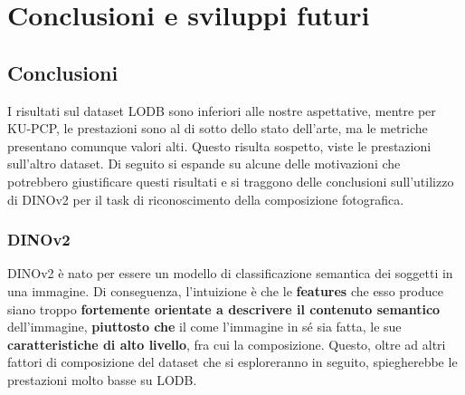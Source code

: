 \chapter{Conclusioni e sviluppi futuri}
\label{conclusioni}

\section{Conclusioni}
I risultati sul dataset LODB sono inferiori alle nostre aspettative, mentre per KU-PCP, le prestazioni sono al di sotto dello stato dell'arte, ma le metriche presentano comunque valori alti. Questo risulta sospetto, viste le prestazioni sull'altro dataset. Di seguito si espande su alcune delle motivazioni che potrebbero giustificare questi risultati e si traggono delle conclusioni sull'utilizzo di DINOv2 per il task di riconoscimento della composizione fotografica.

\subsection{DINOv2}
\label{dinov2_conclusioni}
DINOv2 è nato per essere un modello di classificazione semantica dei soggetti in una immagine. Di conseguenza, l'intuizione è che le \textbf{features} che esso produce siano troppo \textbf{fortemente orientate a descrivere il contenuto semantico} dell'immagine, \textbf{piuttosto che} il come l'immagine in sé sia fatta, le sue \textbf{caratteristiche di alto livello}, fra cui la composizione. Questo, oltre ad altri fattori di composizione del dataset che si esploreranno in seguito, spiegherebbe le prestazioni molto basse su LODB. 

